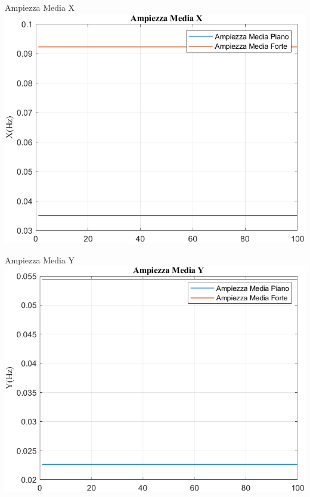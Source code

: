 	\begin{frame}{{Ampiezza Media X}}					
		\centering\includegraphics[height=.8\textheight]{figure/Acc/Trasformata/Ampiezza MediaX}
	\end{frame}
	
	\begin{frame}{{Ampiezza Media Y}}					
		\centering\includegraphics[height=.8\textheight]{figure/Acc/Trasformata/Ampiezza MediaY}
	\end{frame}
	
